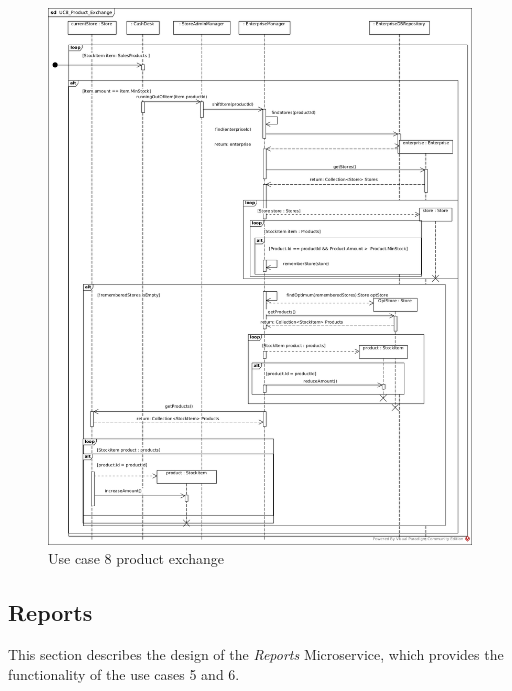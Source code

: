 			\begin{figure}[!h]
				\centering
				\includegraphics[width = 1\textwidth]{img/UC8_Product_Exchange.jpg}
				\caption{Use case 8 product exchange}
				\label{MS_UC8}
			\end{figure}
		\FloatBarrier	
		
		\subsection{Reports}
		This section describes the design of the \textit{Reports} Microservice, which provides the functionality of the use cases 5 and 6.
		
